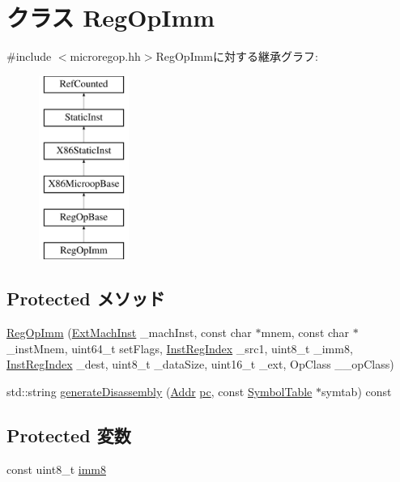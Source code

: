 \hypertarget{classX86ISA_1_1RegOpImm}{
\section{クラス RegOpImm}
\label{classX86ISA_1_1RegOpImm}
}


{\ttfamily \#include $<$microregop.hh$>$}RegOpImmに対する継承グラフ:\begin{figure}[H]
\begin{center}
\leavevmode
\includegraphics[height=6cm]{classX86ISA_1_1RegOpImm}
\end{center}
\end{figure}
\subsection*{Protected メソッド}
\begin{DoxyCompactItemize}
\item 
\hyperlink{classX86ISA_1_1RegOpImm_ae92bb41f49c86a1b1f95406cd75d9243}{RegOpImm} (\hyperlink{structX86ISA_1_1ExtMachInst}{ExtMachInst} \_\-machInst, const char $\ast$mnem, const char $\ast$\_\-instMnem, uint64\_\-t setFlags, \hyperlink{structX86ISA_1_1InstRegIndex}{InstRegIndex} \_\-src1, uint8\_\-t \_\-imm8, \hyperlink{structX86ISA_1_1InstRegIndex}{InstRegIndex} \_\-dest, uint8\_\-t \_\-dataSize, uint16\_\-t \_\-ext, OpClass \_\-\_\-opClass)
\item 
std::string \hyperlink{classX86ISA_1_1RegOpImm_a95d323a22a5f07e14d6b4c9385a91896}{generateDisassembly} (\hyperlink{base_2types_8hh_af1bb03d6a4ee096394a6749f0a169232}{Addr} \hyperlink{namespaceX86ISA_aecb63c74e066ecd98e04d057e39028c9}{pc}, const \hyperlink{classSymbolTable}{SymbolTable} $\ast$symtab) const 
\end{DoxyCompactItemize}
\subsection*{Protected 変数}
\begin{DoxyCompactItemize}
\item 
const uint8\_\-t \hyperlink{classX86ISA_1_1RegOpImm_a7dfee5e1276e6f73a91d19ef3d59f5d4}{imm8}
\end{DoxyCompactItemize}


